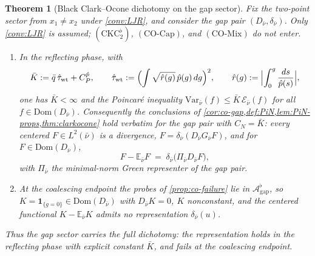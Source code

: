 \documentclass[reqno,final,11pt]{amsart}
\theoremstyle{plain}
\newtheorem{theorem}{Theorem}[section]
\theoremstyle{definition}
\theoremstyle{remark}
\newcommand{\E}{\mathbb E}
\newcommand{\Dom}{\mathrm{Dom}}
\newcommand{\cA}{\mathcal A}
\newcommand{\cE}{\mathcal E}
\newcommand{\COcap}{(\mathrm{CO\text{-}Cap})}
\newcommand{\COmix}{(\mathrm{CO\text{-}Mix})}
\begin{document}
\begin{theorem}[Black Clark--Ocone dichotomy on the gap sector]\label{thm:gap-co}
Fix the two-point sector from $x_1\neq x_2$ under \cref{conv:LJR}, and consider
the gap pair $(D_{\bar\nu},\delta_{\bar\nu})$. Only \cref{conv:LJR} is
assumed; $(\mathrm{CKC}_2^{\flat})$, $\COcap$, and $\COmix$ do not enter.
\begin{enumerate}
\item[\textnormal{(R)}] In the reflecting phase, with
\[
  \bar K:=\bar q\,\hat\tau_{\mathrm{wt}}+C^{\hat p}_P,\qquad
  \hat\tau_{\mathrm{wt}}:=\Bigl(\int\sqrt{\hat r(g)}\,\hat p(g)\,dg\Bigr)^{2},\qquad
  \hat r(g):=\Bigl|\int_0^g\frac{ds}{\hat p(s)}\Bigr|,
\]
one has $\bar K<\infty$ and the Poincar\'e inequality
$\mathrm{Var}_{\bar\nu}(f)\le\bar K\,\cE_{\bar\nu}(f)$ for all
$f\in\Dom(D_{\bar\nu})$. Consequently the conclusions of
\cref{cor:co-gap,def:PiN,lem:PiN-props,thm:clarkocone} hold verbatim for the
gap pair with $C_N=\bar K$: every centered $F\in L^2(\bar\nu)$ is a divergence,
$F=\delta_{\bar\nu}(D_{\bar\nu}G_{\bar\nu}F)$, and for $F\in\Dom(D_{\bar\nu})$,
\[
  F-\E_{\bar\nu}F\;=\;\delta_{\bar\nu}\bigl(\Pi_{\bar\nu}D_{\bar\nu}F\bigr),
\]
with $\Pi_{\bar\nu}$ the minimal-norm Green representer of the gap pair.
\item[\textnormal{(C)}] At the coalescing endpoint the probes of
\cref{prop:co-failure} lie in $\cA^{\flat}_{\mathrm{gap}}$, so
$K=\mathbf 1_{\{g=0\}}\in\Dom(D_{\bar\nu})$ with $D_{\bar\nu}K=0$, $K$
nonconstant, and the centered functional $K-\E_{\bar\nu}K$ admits no
representation $\delta_{\bar\nu}(u)$.
\end{enumerate}
Thus the gap sector carries the full dichotomy:
the representation holds in the reflecting phase with explicit constant
$\bar K$, and fails at the coalescing endpoint.
\end{theorem}
\end{document}
